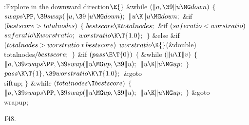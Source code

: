 \B{}:Explore in the downward direction\X${}\E{}$\6
\&{while} ${}(\|o,\39\|u\MG\\{down}){}$\5
${}\{{}$\1\6
${}\\{swaps}\PP,\39\\{swap}(\|u,\39\|u\MG\\{down});{}$\6
${}\|u\K\|u\MG\\{down};{}$\6
\&{if} ${}(\\{bestscore}>\\{totalnodes}){}$\5
${}\{{}$\1\6
${}\\{bestscore}\K\\{totalnodes};{}$\6
\&{if} ${}(\\{saferatio}<\\{worstratio}){}$\1\5
${}\\{saferatio}\K\\{worstratio};{}$\2\6
${}\\{worstratio}\K\T{1.0};{}$\6
\4${}\}{}$\5
\2\&{else} \&{if} ${}(\\{totalnodes}>\\{worstratio}*\\{bestscore}){}$\1\5
${}\\{worstratio}\K{}$(\&{double}) \\{totalnodes}${}/\\{bestscore};{}$\2\6
\4${}\}{}$\2\6
\&{if} ${}(\\{pass}\E\T{0}){}$\5
${}\{{}$\1\6
\&{while} ${}(\|u\I\|v){}$\5
${}\{{}$\1\6
${}\|o,\39\\{swaps}\PP,\39\\{swap}(\|u\MG\\{up},\39\|u);{}$\6
${}\|u\K\|u\MG\\{up};{}$\6
\4${}\}{}$\2\6
${}\\{pass}\K\T{1},\39\\{worstratio}\K\T{1.0};{}$\6
\&{goto} \\{siftup};\6
\4${}\}{}$\2\6
\&{while} ${}(\\{totalnodes}\I\\{bestscore}){}$\5
${}\{{}$\1\6
${}\|o,\39\\{swaps}\PP,\39\\{swap}(\|u\MG\\{up},\39\|u);{}$\6
${}\|u\K\|u\MG\\{up};{}$\6
\4${}\}{}$\2\6
\&{goto} \\{wrapup};\par
\U148.\fi

